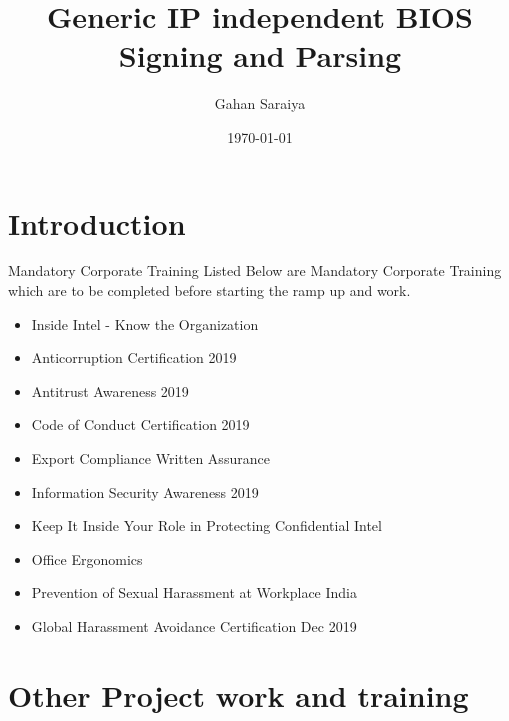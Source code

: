 \documentclass{beamer}
\title{Generic IP independent BIOS Signing and Parsing}
\date{\today}
\author[Gahan Saraiya]{Gahan Saraiya}
\institute[18MCEC10]
{
  Institute of Technology\\
  Nirma University
}
\begin{document}
\begin{frame}
\titlepage
\end{frame}





\section{Introduction}
\begin{frame}{Mandatory Corporate Training}
Listed Below are Mandatory Corporate Training which are to be completed before starting the ramp up and work.
\begin{itemize}
    \item Inside Intel - Know the Organization
    \item Anticorruption Certification 2019
    \item Antitrust Awareness 2019
    \item Code of Conduct Certification 2019
    \item Export Compliance Written Assurance
    \item Information Security Awareness 2019
    \item Keep It Inside Your Role in Protecting Confidential Intel
    \item Office Ergonomics
    \item Prevention of Sexual Harassment at Workplace India
    \item Global Harassment Avoidance Certification Dec 2019
\end{itemize}
\end{frame}

\section{Other Project work and training}
\end{document}
